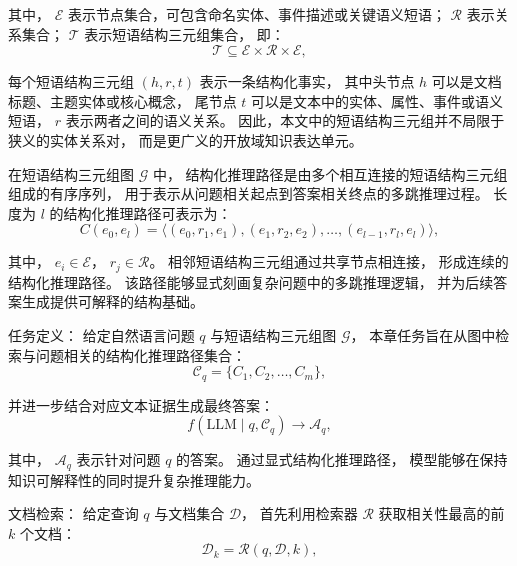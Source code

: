 \noindent 其中，
$\mathcal{E}$ 表示节点集合，可包含命名实体、事件描述或关键语义短语；
$\mathcal{R}$ 表示关系集合；
$\mathcal{T}$ 表示短语结构三元组集合，
即：
\begin{equation}
\mathcal{T} \subseteq \mathcal{E} \times \mathcal{R} \times \mathcal{E},
\end{equation}

每个短语结构三元组 $(h,r,t)$ 表示一条结构化事实，
其中头节点 $h$ 可以是文档标题、主题实体或核心概念，
尾节点 $t$ 可以是文本中的实体、属性、事件或语义短语，
$r$ 表示两者之间的语义关系。
因此，本文中的短语结构三元组并不局限于狭义的实体关系对，
而是更广义的开放域知识表达单元。

\begin{definition}
\label{def:evidence_chain}
在短语结构三元组图 $\mathcal{G}$ 中，
结构化推理路径是由多个相互连接的短语结构三元组组成的有序序列，
用于表示从问题相关起点到答案相关终点的多跳推理过程。
长度为 $l$ 的结构化推理路径可表示为：
\begin{equation}
C(e_0,e_l)=\langle
(e_0,r_1,e_1),
(e_1,r_2,e_2),
\dots,
(e_{l-1},r_l,e_l)
\rangle,
\end{equation}

\noindent 其中，
$e_i \in \mathcal{E}$，
$r_j \in \mathcal{R}$。
相邻短语结构三元组通过共享节点相连接，
形成连续的结构化推理路径。
该路径能够显式刻画复杂问题中的多跳推理逻辑，
并为后续答案生成提供可解释的结构基础。
\end{definition}

任务定义：
给定自然语言问题 $q$ 与短语结构三元组图 $\mathcal{G}$，
本章任务旨在从图中检索与问题相关的结构化推理路径集合：
\begin{equation}
\mathcal{C}_q=\{C_1,C_2,\dots,C_m\},
\end{equation}

并进一步结合对应文本证据生成最终答案：
\begin{equation}
f(\text{LLM}\mid q,\mathcal{C}_q)\rightarrow \mathcal{A}_q,
\end{equation}

\noindent 其中，
$\mathcal{A}_q$ 表示针对问题 $q$ 的答案。
通过显式结构化推理路径，
模型能够在保持知识可解释性的同时提升复杂推理能力。

文档检索：
给定查询 $q$ 与文档集合 $\mathcal{D}$，
首先利用检索器 $\mathcal{R}$ 获取相关性最高的前 $k$ 个文档：
\begin{equation}
\mathcal{D}_k=\mathcal{R}(q,\mathcal{D},k),
\end{equation}

